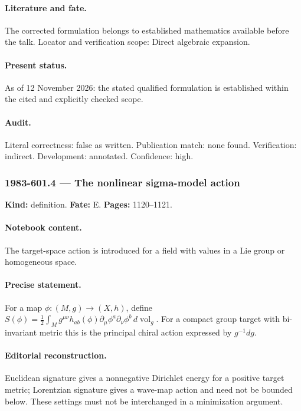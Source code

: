 \paragraph{Literature and fate.} The corrected formulation belongs to established mathematics available before the talk. Locator and verification scope: Direct algebraic expansion.

\paragraph{Present status.} As of 12 November 2026: the stated qualified formulation is established within the cited and explicitly checked scope.

\paragraph{Audit.} Literal correctness: false as written. Publication match: none found. Verification: indirect. Development: annotated. Confidence: high.

\subsubsection{1983-601.4 --- The nonlinear sigma-model action}

\label{item:1983-601.4}

\noindent\textbf{Kind:} definition. \textbf{Fate:} E. \textbf{Pages:} 1120--1121.\par

\paragraph{Notebook content.} The target-space action is introduced for a field with values in a Lie group or homogeneous space.

\paragraph{Precise statement.} For a map \(\phi:(M,g)\to(X,h)\), define \(S(\phi)=\frac12\int_M g^{\mu\nu}h_{ab}(\phi)\partial_\mu\phi^a\partial_\nu\phi^b\,d\operatorname{vol}_g\). For a compact group target with bi-invariant metric this is the principal chiral action expressed by \(g^{-1}dg\).

\paragraph{Editorial reconstruction.} Euclidean signature gives a nonnegative Dirichlet energy for a positive target metric; Lorentzian signature gives a wave-map action and need not be bounded below. These settings must not be interchanged in a minimization argument.

